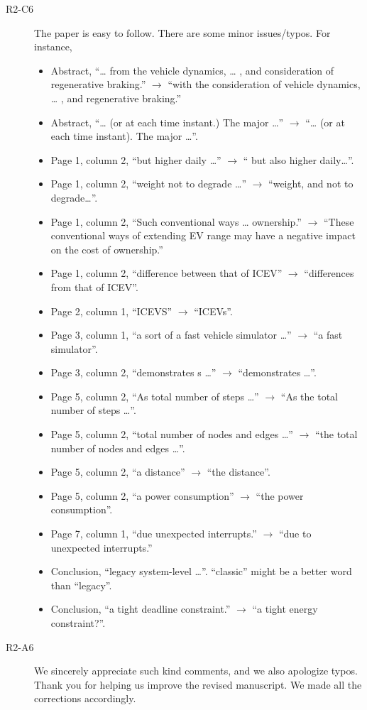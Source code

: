 \documentclass[onecolumn]{IEEEconf}
\begin{document}
\begin{description}
\item [R2-C6] The paper is easy to follow. There are some minor issues/typos. For instance,
\begin{itemize}
\item Abstract, ``… from the vehicle dynamics, … , and consideration of regenerative braking.'' $\rightarrow$ ``with the consideration of vehicle dynamics, … , and regenerative braking.''
\item Abstract, ``… (or at each time instant.) The major …'' $\rightarrow$ ``… (or at each time instant). The major …''.
\item Page 1, column 2, ``but higher daily …'' $\rightarrow$ `` but also higher daily…''.
\item Page 1, column 2, ``weight not to degrade …'' $\rightarrow$ ``weight, and not to degrade…''.
\item Page 1, column 2, ``Such conventional ways … ownership.'' $\rightarrow$ ``These conventional ways of extending EV range may have a negative impact on the cost of ownership.''
\item Page 1, column 2, ``difference between that of ICEV'' $\rightarrow$ ``differences from that of ICEV''.
\item Page 2, column 1, ``ICEVS'' $\rightarrow$ ``ICEVs''.
\item Page 3, column 1, ``a sort of a fast vehicle simulator …'' $\rightarrow$ ``a fast simulator''.
\item Page 3, column 2, ``demonstrates s …'' $\rightarrow$ ``demonstrates …''.
\item Page 5, column 2, ``As total number of steps …'' $\rightarrow$ ``As the total number of steps …''.
\item Page 5, column 2, ``total number of nodes and edges …'' $\rightarrow$ ``the total number of nodes and edges …''.
\item Page 5, column 2, ``a distance'' $\rightarrow$ ``the distance''.
\item Page 5, column 2, ``a power consumption'' $\rightarrow$ ``the power consumption''.
\item Page 7, column 1, ``due unexpected interrupts.'' $\rightarrow$ ``due to unexpected interrupts.''
\item Conclusion, ``legacy system-level …''. ``classic” might be a better word than “legacy''.
\item Conclusion, ``a tight deadline constraint.'' $\rightarrow$ ``a tight energy constraint?''.
\end{itemize}

\item [R2-A6] We sincerely appreciate such kind comments, and we also apologize typos. Thank you for helping us improve the revised  manuscript. We made all the corrections accordingly. 
\end{description}
\end{document}
